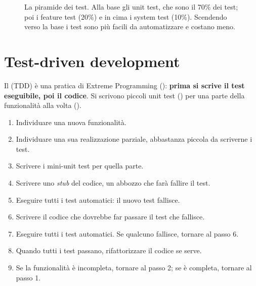 \begin{figure}[ht]
\centering
{}
\caption{La piramide dei test. Alla base gli unit test, che sono il 70\% dei test; poi i feature test (20\%) e in cima
i system test (10\%). Scendendo verso la base i test sono più facili da automatizzare e costano meno.}
\label{fig:test-piramide}
\end{figure}

\section{Test-driven development}
\label{sec:test-tdd}

Il  (TDD) è una pratica di Extreme Programming (): \textbf{prima si
scrive il test eseguibile, poi il codice}. Si scrivono piccoli unit test () per una parte della
funzionalità alla volta ().

\begin{algoritmo}
\begin{enumerate}
  \item Individuare una nuova funzionalità.
  \item Individuare una sua realizzazione parziale, abbastanza piccola da scriverne i test.
  \item Scrivere i mini-unit test per quella parte.
  \item Scrivere uno \emph{stub} del codice, un abbozzo che farà fallire il test.
  \item Eseguire tutti i test automatici: il nuovo test fallisce.
  \item Scrivere il codice che dovrebbe far passare il test che fallisce.
  \item Eseguire tutti i test automatici. Se qualcuno fallisce, tornare al passo 6.
  \item Quando tutti i test passano, rifattorizzare il codice se serve.
  \item Se la funzionalità è incompleta, tornare al passo 2; se è completa, tornare al passo 1.
\end{enumerate}
\end{algoritmo}

